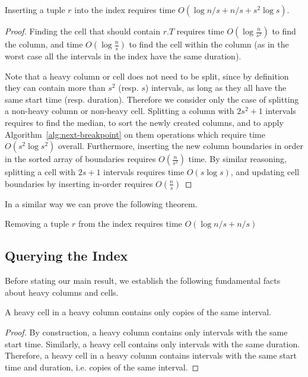 \documentclass[sigconf,nonacm,anonymous]{acmart}
\theoremstyle{definition}
\newcommand{\BO}[1]{O\left(#1\right)}
\newcommand{\rT}{\ensuremath{r.T}}
\begin{document}
\begin{theorem}
	Inserting a tuple $r$ into the index requires
	time $\BO{\log n/s + n/s + s^2 \log s}$.
\end{theorem}
\begin{proof}
	Finding the cell that should contain $\rT$ requires time $\BO{\log\frac{n}{s^2}}$ to find the column, and
	time $\BO{\log\frac{n}{s}}$ to find the cell within the column (as in the worst case all the intervals
	in the index have the same duration).

  Note that a heavy column or cell does not need to be split, since by definition
  they can contain more than $s^2$ (resp. $s$) intervals, as long as they all have
  the same start time (resp. duration).
  Therefore we consider only the case of splitting a non-heavy column or non-heavy cell.
	Splitting a column with $2s^2 + 1$ intervals requires to find the median,
	to sort the newly created columns, and
	to apply Algorithm~\ref{alg:next-breakpoint} on them
	operations which require time $\BO{s^2\log s^2}$ overall.
	Furthermore, inserting the new column boundaries in order in the sorted array of boundaries requires
	$\BO{\frac{n}{s^2}}$ time.
	By similar reasoning, splitting a cell with $2s+1$ intervals requires time $\BO{s\log s}$,
	and updating cell boundaries by inserting in-order requires $\BO{\frac{n}{s}}$
\end{proof}

In a similar way we can prove the following theorem.

\begin{theorem}
	Removing a tuple $r$ from the index requires time $\BO{\log n/s + n/s}$
\end{theorem}


\subsection{Querying the Index}

Before stating our main result, we establish the following fundamental facts
about heavy columns and cells.

\begin{lemma}\label{lem:heavy}
	A heavy cell in a heavy column contains only copies of the same interval.
\end{lemma}
\begin{proof}
	By construction, a heavy column contains only intervals with the same start time.
	Similarly, a heavy cell contains only intervals with the same duration.
	Therefore, a heavy cell in a heavy column 
	contains intervals with the same
	start time and duration, i.e. copies of the same interval.
\end{proof}
\end{document}
